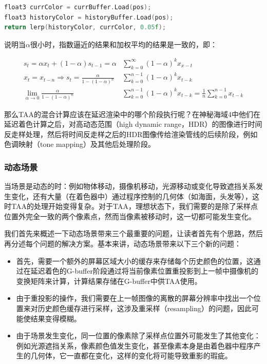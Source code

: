 \begin{lstlisting}[language=C++]
float3 currColor = currBuffer.Load(pos);
float3 historyColor = historyBuffer.Load(pos);
return lerp(historyColor, currColor, 0.05f);
\end{lstlisting}

\cite{a:HighQualityTemporalSupersampling}说明当$\alpha$很小时，指数逼近的结果和加权平均的结果是一致的，即：

\begin{equation}
\begin{aligned}
	s_t=\alpha x_t+(1-\alpha)s_{t-1}=\alpha &\sum^{\infty}_{k=0}(1-\alpha)^{k}x_{x-t}\\
	x_t=x_{t-n}\Rightarrow s_t=\frac{\alpha}{1-(1-\alpha)^{n}}&\sum^{n-1}_{k=0}(1-\alpha)^{k}x_{t-k}\\
	\lim_{\alpha\rightarrow 0}\frac{\alpha}{1-(1-\alpha)^{n}}&\sum^{n-1}_{k=0}(1-\alpha)^{k}x_{t-k}=\frac{1}{n}\sum^{n-1}_{k=0}x_{t-k}
\end{aligned}
\end{equation}

那么TAA的混合计算应该在延迟渲染中的哪个阶段执行呢？在神秘海域4中他们在延迟着色计算之后，对高动态范围（high dynamic range，HDR）的图像进行时间反走样处理，然后将时间反走样之后的HDR图像传给渲染管线的后续阶段，例如色调映射（tone mapping）及其他后处理阶段。







\subsubsection{动态场景}
当场景是动态的时：例如物体移动，摄像机移动，光源移动或变化导致遮挡关系发生变化，还有大量（在着色器中）通过程序控制的几何体（如海面，头发等），这时TAA的处理开始变得复杂。对于TAA，理想状态下，我们需要的是除了采样点位置外完全一致的两个像素点，然而当像素被移动时，这一切都可能发生变化。

我们首先来概述一下动态场景带来三个最重要的问题，让读者首先有个思路，然后再分述每个问题的解决方案。基本来讲，动态场景带来以下三个新的问题：

\begin{itemize}
	\item 首先，需要一个额外的屏幕区域大小的缓存来存储每个历史颜色的位置，这通过在延迟着色的G-buffer阶段通过将当前像素位置重投影到上一帧中摄像机的变换矩阵来计算，计算结果存储在G-buffer中供TAA使用。
	\item 由于重投影的操作，我们需要在上一帧图像的离散的屏幕分辨率中找出一个位置来对历史颜色缓存进行采样，这涉及重采样（resampling）的问题，因此可能使结果变得模糊。
	\item 由于场景发生变化，同一位置的像素除了采样点位置外可能发生了其他变化：例如光源遮挡关系，像素颜色值发生变化，甚至像素本身是由着色器中程序产生的几何体，它一直都在变化，这样的变化将可能导致重影的瑕疵。
\end{itemize}

